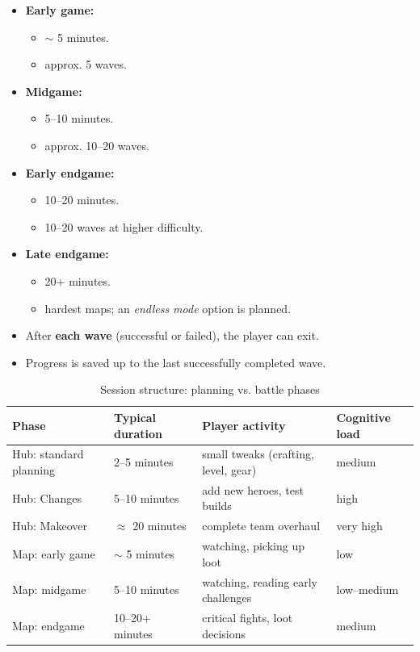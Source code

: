 \begin{itemize}
	\item \textbf{Early game:} 
	\begin{itemize}
		\item \(\sim\) 5 minutes.
		\item approx. 5 waves.
	\end{itemize}
	\item \textbf{Midgame:}
	\begin{itemize}
		\item 5--10 minutes.
		\item approx. 10--20 waves.
	\end{itemize}
	\item \textbf{Early endgame:}
	\begin{itemize}
		\item 10--20 minutes.
		\item 10--20 waves at higher difficulty.
	\end{itemize}
	\item \textbf{Late endgame:}
	\begin{itemize}
		\item 20+ minutes.
		\item hardest maps; an \emph{endless mode} option is planned.
	\end{itemize}
\end{itemize}

\begin{itemize}
	\item After \textbf{each wave} (successful or failed), the player can exit.
	\item Progress is saved up to the last successfully completed wave.
\end{itemize}

\begin{table}[h]
	\centering
	\begin{tabular}{p{3.5cm}p{3.5cm}p{5cm}p{3cm}}
		\textbf{Phase} & \textbf{Typical duration} & \textbf{Player activity} & \textbf{Cognitive load} \\
		\hline
		Hub: standard planning & 2--5 minutes & small tweaks (crafting, level, gear) & medium \\
		Hub: Changes & 5--10 minutes & add new heroes, test builds & high \\
		Hub: Makeover & \(\approx\) 20 minutes & complete team overhaul & very high \\
		Map: early game & \(\sim\) 5 minutes & watching, picking up loot & low \\
		Map: midgame & 5--10 minutes & watching, reading early challenges & low--medium \\
		Map: endgame & 10--20+ minutes & critical fights, loot decisions & medium \\
	\end{tabular}
	\caption{Session structure: planning vs. battle phases}
	\label{tab:session-structure}
\end{table}

